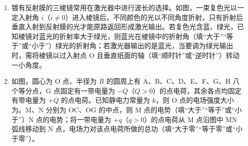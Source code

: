 \documentclass[\gkver]{gaokaozhenti}
\begin{document}
\begin{enumerate}
{末状态时

$T_{2} = (27 + 273) \UK = 300 \UK$

根据查理定律 $\frac{p_{1}}{T_{1}} = \frac{p_{2}}{T_{2}}$

代入数值解得 $p_{2} = 3p_{0}$

（2）一定质量的理想气体的内能只与温度有关，故温度升高时内能增大，故 $27 \UdC$ 时胎内气体的内能大于 $17 \UdC$ 时的内能。
}

\item
镀有反射膜的三棱镜常用在激光器中进行波长的选择。如图，一束复色光以一定入射角 $i$（$i \neq 0$）进入棱镜后，不同颜色的光以不同角度折射，只有折射后垂直入射到反射膜的光才能原路返回形成激光输出。若复色光含蓝、绿光，已知棱镜对蓝光的折射率大于绿光，则蓝光在棱镜中的折射角（填“大于”“等于”或“小于”）绿光的折射角；若激光器输出的是蓝光，当要调为绿光输出时，需将棱镜以过入射点 O 且垂直纸面的轴（填“顺时针”或“逆时针”）转动一小角度。

\item
如图，圆心为 O 点、半径为 $R$ 的圆周上有 A、B、C、D、E、F、G、H 八个等分点，G 点固定有一带电量为 $-Q$（$Q > 0$）的点电荷，其余各点均固定有带电量为 $+Q$ 的点电荷。已知静电力常量为 $k$，则 O 点的电场强度大小为。M、N 分别为 OC、OG 的中点，则 M 点的电势（填“大于”“等于”或“小于”）N 点的电势；将一带电量为 $+q$（$q > 0$）的点电荷从 M 点沿图中 MN 弧线移动到 N 点，电场力对该点电荷所做的总功（填“大于零”“等于零”或“小于零”）。
\end{enumerate}
\end{document}
